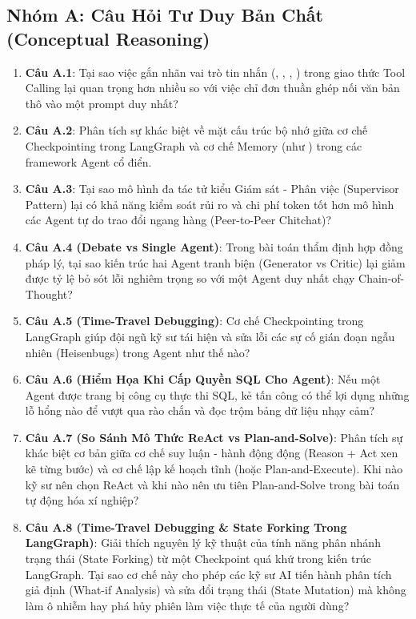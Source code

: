 \subsection{Nhóm A: Câu Hỏi Tư Duy Bản Chất (Conceptual Reasoning)}
\begin{enumerate}
  \item \textbf{Câu A.1}: Tại sao việc gắn nhãn vai trò tin nhắn (, , , ) trong giao thức Tool Calling lại quan trọng hơn nhiều so với việc chỉ đơn thuần ghép nối văn bản thô vào một prompt duy nhất?
  \item \textbf{Câu A.2}: Phân tích sự khác biệt về mặt cấu trúc bộ nhớ giữa cơ chế Checkpointing trong LangGraph và cơ chế Memory (như ) trong các framework Agent cổ điển.
  \item \textbf{Câu A.3}: Tại sao mô hình đa tác tử kiểu Giám sát - Phân việc (Supervisor Pattern) lại có khả năng kiểm soát rủi ro và chi phí token tốt hơn mô hình các Agent tự do trao đổi ngang hàng (Peer-to-Peer Chitchat)?
  \item \textbf{Câu A.4 (Debate vs Single Agent)}: Trong bài toán thẩm định hợp đồng pháp lý, tại sao kiến trúc hai Agent tranh biện (Generator vs Critic) lại giảm được tỷ lệ bỏ sót lỗi nghiêm trọng so với một Agent duy nhất chạy Chain-of-Thought?
  \item \textbf{Câu A.5 (Time-Travel Debugging)}: Cơ chế Checkpointing trong LangGraph giúp đội ngũ kỹ sư tái hiện và sửa lỗi các sự cố gián đoạn ngẫu nhiên (Heisenbugs) trong Agent như thế nào?
  \item \textbf{Câu A.6 (Hiểm Họa Khi Cấp Quyền SQL Cho Agent)}: Nếu một Agent được trang bị công cụ thực thi SQL, kẻ tấn công có thể lợi dụng những lỗ hổng nào để vượt qua rào chắn và đọc trộm bảng dữ liệu nhạy cảm?
  \item \textbf{Câu A.7 (So Sánh Mô Thức ReAct vs Plan-and-Solve)}: Phân tích sự khác biệt cơ bản giữa cơ chế suy luận - hành động động  (Reason + Act xen kẽ từng bước) và cơ chế lập kế hoạch tĩnh  (hoặc Plan-and-Execute). Khi nào kỹ sư nên chọn ReAct và khi nào nên ưu tiên Plan-and-Solve trong bài toán tự động hóa xí nghiệp?
  \item \textbf{Câu A.8 (Time-Travel Debugging \& State Forking Trong LangGraph)}: Giải thích nguyên lý kỹ thuật của tính năng phân nhánh trạng thái (State Forking) từ một Checkpoint quá khứ trong kiến trúc LangGraph. Tại sao cơ chế này cho phép các kỹ sư AI tiến hành phân tích giả định (What-if Analysis) và sửa đổi trạng thái (State Mutation) mà không làm ô nhiễm hay phá hủy phiên làm việc thực tế của người dùng?

\end{enumerate}
